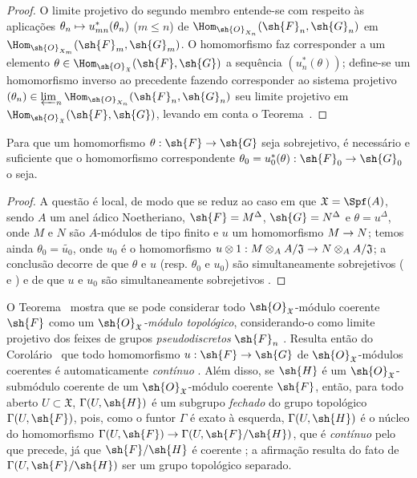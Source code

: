 \documentclass[oneside]{amsart}
\makeatletter
\renewcommand{\leq}{\leqslant}
\newcommand{\ega@arrow}[2]{\mathchoice{#1}{#2}{#2}{#2}}
\let\ega@shortmapsto\mapsto
\renewcommand{\to}{\ega@arrow{\longrightarrow}{\rightarrow}}
\renewcommand{\mapsto}{\ega@arrow{\longmapsto}{\ega@shortmapsto}}
\newcommand{\oldpage}[2][]{{\marginnote{\normalfont\textbf{#1}~|~#2}}\ignorespaces}
\let\EGAOriginalLabel\label
\renewcommand{\label}[1]{\phantomsection\EGAOriginalLabel{#1}}
\makeatother
\begin{document}
\begin{proof}
O limite projetivo do segundo membro entende-se com respeito às aplicações $\theta_n\mapsto u_{mn}^*(\theta_n)$ ($m\leq n$) de $\Hom_{\sh{O}_{X_n}}(\sh{F}_n,\sh{G}_n)$ em $\Hom_{\sh{O}_{X_m}}(\sh{F}_m,\sh{G}_m)$.
O homomorfismo  faz corresponder a um elemento $\theta\in\Hom_{\sh{O}_\mathfrak{X}}(\sh{F},\sh{G})$ a sequência $(u_n^*(\theta))$; define-se um homomorfismo inverso ao precedente fazendo corresponder ao sistema projetivo $(\theta_n)\in\varprojlim_n\Hom_{\sh{O}_{X_n}}(\sh{F}_n,\sh{G}_n)$ seu limite projetivo em $\Hom_{\sh{O}_\mathfrak{X}}(\sh{F},\sh{G})$, levando em conta o Teorema~.
\end{proof}

\begin{corollary}[10.11.5]
\label{I.10.11.5}
Para que um homomorfismo $\theta:\sh{F}\to\sh{G}$ seja sobrejetivo, é necessário e suficiente que o homomorfismo correspondente $\theta_0=u_0^*(\theta):\sh{F}_0\to\sh{G}_0$ o seja.
\end{corollary}

\begin{proof}
A questão é local, de modo que se reduz ao caso em que $\mathfrak{X}=\Spf(A)$, sendo $A$ um anel ádico Noetheriano, $\sh{F}=M^\Delta$, $\sh{G}=N^\Delta$ e $\theta=u^\Delta$, onde $M$ e $N$ são $A$-módulos de tipo finito e $u$ um homomorfismo $M\to N$; temos ainda $\theta_0=\widetilde{u_0}$, onde $u_0$ é o homomorfismo $u\otimes 1:M\otimes_A A/\mathfrak{J}\to N\otimes_A A/\mathfrak{J}$; a conclusão decorre de que $\theta$ e $u$ (resp. $\theta_0$ e $u_0$) são simultaneamente sobrejetivos ( e ) e de que $u$ e $u_0$ são simultaneamente sobrejetivos .
\end{proof}

\begin{env}[10.11.6]
\label{I.10.11.6}
O Teorema~ mostra que se pode considerar todo $\sh{O}_\mathfrak{X}$-módulo coerente $\sh{F}$ como um \emph{$\sh{O}_\mathfrak{X}$-módulo topológico}, considerando-o como limite projetivo dos feixes de grupos \emph{pseudodiscretos} $\sh{F}_n$ .
Resulta então do Corolário~ que todo homomorfismo $u:\sh{F}\to\sh{G}$ de $\sh{O}_\mathfrak{X}$-módulos coerentes é automaticamente \emph{contínuo}
\oldpage[I]{205}
.
Além disso, se $\sh{H}$ é um $\sh{O}_\mathfrak{X}$-submódulo coerente de um $\sh{O}_\mathfrak{X}$-módulo coerente $\sh{F}$, então, para todo aberto $U\subset\mathfrak{X}$, $\Gamma(U,\sh{H})$ é um subgrupo \emph{fechado} do grupo topológico $\Gamma(U,\sh{F})$, pois, como o funtor $\Gamma$ é exato à esquerda, $\Gamma(U,\sh{H})$ é o núcleo do homomorfismo $\Gamma(U,\sh{F})\to\Gamma(U,\sh{F}/\sh{H})$, que é \emph{contínuo} pelo que precede, já que $\sh{F}/\sh{H}$ é coerente ; a afirmação resulta do fato de $\Gamma(U,\sh{F}/\sh{H})$ ser um grupo topológico separado.
\end{env}
\end{document}
